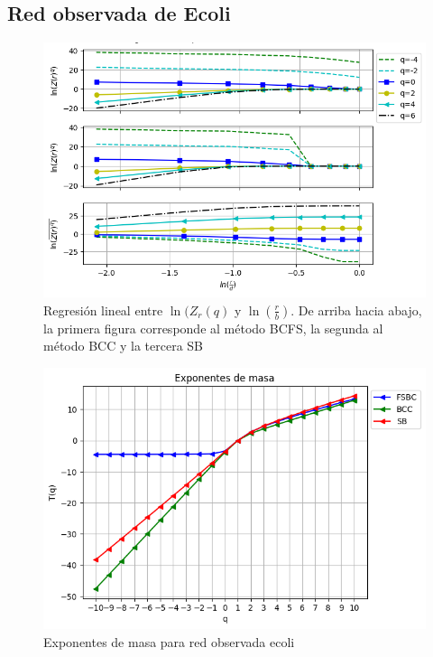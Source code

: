 \subsection{Red observada de Ecoli}

\begin{figure}[H]
    \centering
    \includegraphics[scale=0.7]{Capitulo4Multifractalidad/imagenes/a_TqLnrBCecoli.png}
    \caption{Regresión lineal entre $\ln(Z_r(q)$ y $\ln(\frac{r}{b})$. De arriba hacia abajo, la primera figura corresponde al método BCFS, la segunda al método BCC y la tercera SB}
\end{figure}

\begin{figure}[H]
    \centering
    \includegraphics[scale=0.7]{Capitulo4Multifractalidad/imagenes/a_Tqecoli.png}
    \caption{Exponentes de masa para red observada ecoli}
\end{figure}

